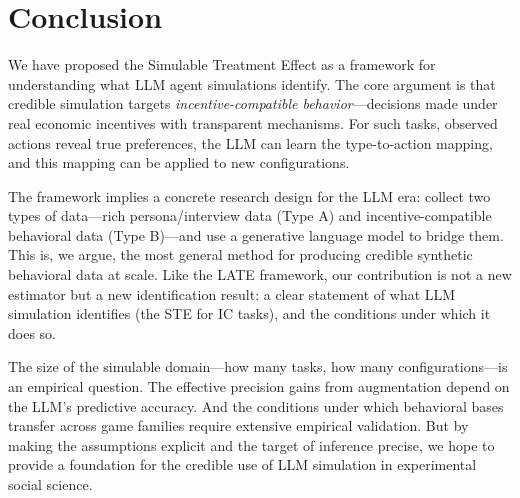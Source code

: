\documentclass[12pt]{article}
\begin{document}
\section{Conclusion}
\label{sec:conclusion}

We have proposed the Simulable Treatment Effect as a framework for understanding what LLM agent simulations identify. The core argument is that credible simulation targets \textit{incentive-compatible behavior}---decisions made under real economic incentives with transparent mechanisms. For such tasks, observed actions reveal true preferences, the LLM can learn the type-to-action mapping, and this mapping can be applied to new configurations.

The framework implies a concrete research design for the LLM era: collect two types of data---rich persona/interview data (Type A) and incentive-compatible behavioral data (Type B)---and use a generative language model to bridge them. This is, we argue, the most general method for producing credible synthetic behavioral data at scale. Like the LATE framework, our contribution is not a new estimator but a new identification result: a clear statement of what LLM simulation identifies (the STE for IC tasks), and the conditions under which it does so.

The size of the simulable domain---how many tasks, how many configurations---is an empirical question. The effective precision gains from augmentation depend on the LLM's predictive accuracy. And the conditions under which behavioral bases transfer across game families require extensive empirical validation. But by making the assumptions explicit and the target of inference precise, we hope to provide a foundation for the credible use of LLM simulation in experimental social science.



\end{document}
